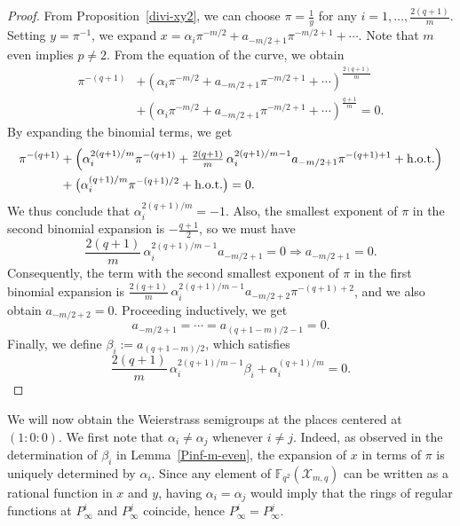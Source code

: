 \documentclass[12pt]{amsart}
\theoremstyle{remark}
\theoremstyle{definition}
\newcommand{\coloneqq}{\mathrel{:=}}
\begin{document}
\begin{proof}
    From Proposition~\ref{divi-xy2}, we can choose $\pi = \frac{1}{y}$ for any
    $i = 1, \ldots, \frac{2(q+1)}{m}$. Setting $y = \pi^{-1}$, we expand
    $x = \alpha_i \pi^{-m/2} + a_{-m/2+1}\pi^{-m/2+1} + \cdots$.
    Note that $m$ even implies $p \neq 2$.
    From the equation of the curve, we obtain
    \begin{align*}
        \pi^{-(q+1)}
        &+ \left(\alpha_i \pi^{-m/2} + a_{-m/2+1}\pi^{-m/2+1} + \cdots
          \right)^{\frac{2(q+1)}{m}} \\
        &+ \left(\alpha_i \pi^{-m/2} + a_{-m/2+1}\pi^{-m/2+1} + \cdots
          \right)^{\frac{q+1}{m}} = 0.
    \end{align*}
    By expanding the binomial terms, we get
    \begin{align*}
        \pi^{-(q+1)}
        &+ \Bigl(\alpha_i^{2(q+1)/m}\pi^{-(q+1)}
           + \tfrac{2(q+1)}{m}\,\alpha_i^{2(q+1)/m-1}a_{-m/2+1}
             \pi^{-(q+1)+1} + \textrm{h.o.t.}\Bigr) \\
        &+ \bigl(\alpha_i^{(q+1)/m}\pi^{-(q+1)/2} + \textrm{h.o.t.}\bigr)
         = 0.
    \end{align*}
    We thus conclude that $\alpha_i^{2(q+1)/m} = -1$. Also, the smallest
    exponent of $\pi$ in the second binomial expansion is $-\frac{q+1}{2}$,
    so we must have
    $$\frac{2(q+1)}{m}\,\alpha_i^{2(q+1)/m-1}a_{-m/2+1} = 0
      \Longrightarrow a_{-m/2+1} = 0.$$
    Consequently, the term with the second smallest exponent of $\pi$ in the
    first binomial expansion is
    $\frac{2(q+1)}{m}\,\alpha_i^{2(q+1)/m-1}a_{-m/2+2}\pi^{-(q+1)+2}$,
    and we also obtain $a_{-m/2+2} = 0$. Proceeding inductively, we get
    $$a_{-m/2+1} = \cdots = a_{(q+1-m)/2-1} = 0.$$
    Finally, we define $\beta_i \coloneqq a_{(q+1-m)/2}$, which satisfies
    $$\frac{2(q+1)}{m}\,\alpha_i^{2(q+1)/m-1}\beta_i
      + \alpha_i^{(q+1)/m} = 0. $$
\end{proof}

We will now obtain the Weierstrass semigroups at the places centered at
$(1:0:0)$. We first note that $\alpha_i \neq \alpha_j$ whenever $i \neq j$.
Indeed, as observed in the determination of $\beta_i$ in
Lemma~\ref{Pinf-m-even}, the expansion of $x$ in terms of $\pi$ is uniquely
determined by $\alpha_i$. Since any element of
$\mathbb{F}_{q^2}(\mathcal{X}_{m,q})$ can be written as a rational function
in $x$ and $y$, having $\alpha_i = \alpha_j$ would imply that the rings of
regular functions at $P_{\infty}^i$ and $P_{\infty}^j$ coincide, hence
$P_{\infty}^i = P_{\infty}^j$.
\end{document}
